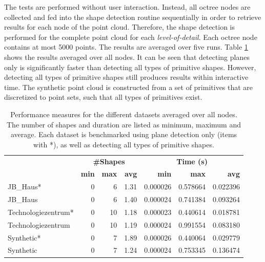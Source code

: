 The tests are performed without user interaction. Instead, all octree nodes are collected and fed into the shape detection routine sequentially in order to retrieve results for each node of the point cloud. Therefore, the shape detection is performed for the complete point cloud for each \textit{level-of-detail}. Each octree node contains at most 5000 points. The results are averaged over five runs. Table \ref{table:schnabel_benchmarks} shows the results averaged over all nodes. It can be seen that detecting planes only is significantly faster than detecting all types of primitive shapes. However, detecting all types of primitive shapes still produces results within interactive time. The synthetic point cloud is constructed from a set of primitives that are discretized to point sets, such that all types of primitives exist. 

\begin{table}
	\centering
	\begin{tabular}{ l || r | r | r || r | r | r}
			&\multicolumn{3}{c||}{\textbf{\#Shapes}} & \multicolumn{3}{c}{\textbf{Time (s)}}\\
			&\textbf{min} & \textbf{max} & \textbf{avg}  & \textbf{min} & \textbf{max} & \textbf{avg}  \\
			\hline
			JB\_Haus*							& 0 & 6  & 1.31 & 0.000026 & 0.578664 & 0.022396 \\
			JB\_Haus 							& 0 & 6  & 1.40 & 0.000024 & 0.741384 & 0.093264 \\
			Technologiezentrum*		& 0 & 10 & 1.18 & 0.000023 & 0.440614 & 0.018781 \\
			Technologiezentrum 		& 0 & 10 & 1.19 & 0.000024 & 0.991554 & 0.083180 \\
			Synthetic*						& 0 & 7  & 1.89 & 0.000026 & 0.440064 & 0.029779 \\
			Synthetic 						& 0 & 7  & 1.24 & 0.000024 & 0.753345 & 0.136474 \\
		\end{tabular}
	\caption{Performance measures for the different datasets averaged over all nodes. The number of shapes and duration are listed as minimum, maximum and average. Each dataset is benchmarked using plane detection only (items with *), as well as detecting all types of primitive shapes. }
	\label{table:schnabel_benchmarks}
\end{table}


